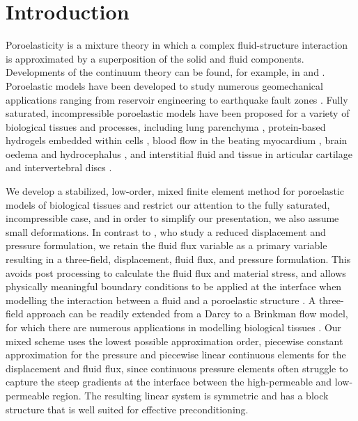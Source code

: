 
\section {Introduction}
\label{sec:intro}

Poroelasticity is a mixture theory in which a complex fluid-structure interaction is approximated by a superposition of the solid and fluid components.  Developments of the continuum theory can be found, for example, in \cite{coussy2004poromechanics} and \cite{boer2005trends}. Poroelastic models have been developed to study numerous geomechanical applications ranging from reservoir engineering \cite{phillips2007coupling} to earthquake fault zones \cite{white2008stabilized}. Fully saturated, incompressible poroelastic models have been proposed for a variety of biological tissues and processes, including lung parenchyma \cite{kowalczyk1993mechanical}, protein-based hydrogels embedded within cells \cite{galie2011linear}, blood flow in the beating myocardium \cite{chapelle2010poroelastic,cookson2011novel}, brain oedema and hydrocephalus \cite{li2010three,wirth2006axisymmetric}, and interstitial fluid and tissue in articular cartilage and intervertebral discs \cite{mow1980biphasic,holmes1990nonlinear,galbusera2011comparison}.

We develop a stabilized, low-order, mixed finite element method for poroelastic models of biological tissues and restrict our attention to the fully saturated, incompressible case, and in order to simplify our presentation, we also assume small deformations. In contrast to \cite{murad1994stability,white2008stabilized,murad1994stability}, who study a reduced displacement and pressure formulation, we retain the fluid flux variable as a primary variable resulting in a three-field, displacement, fluid flux, and pressure formulation. This avoids post processing to calculate the fluid flux and material stress, and allows physically meaningful boundary conditions to be applied at the interface when modelling the interaction between a fluid and a poroelastic structure \cite{badia2009coupling}. A three-field approach can be readily extended from a Darcy to a Brinkman flow model, for which there are numerous applications in modelling biological tissues \cite{khaled2003role}. Our mixed scheme uses the lowest possible approximation order, piecewise constant approximation for the pressure and piecewise linear continuous elements for the displacement and fluid flux, since continuous pressure elements often struggle to capture the steep gradients at the interface between the high-permeable and low-permeable region. The resulting linear system is symmetric and has a block structure that is well suited for effective preconditioning.

